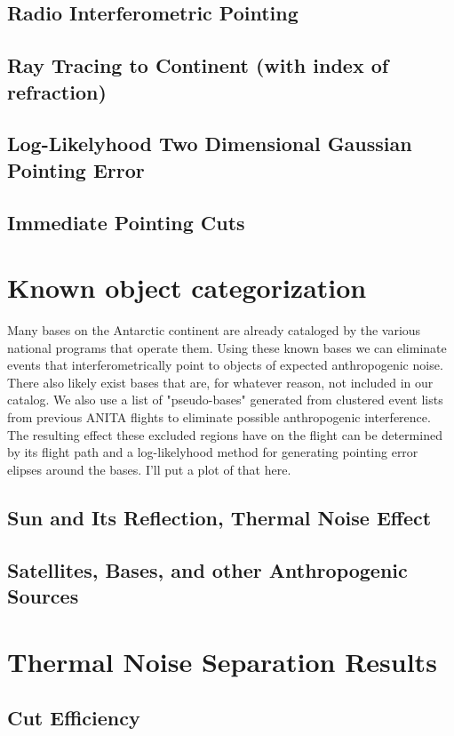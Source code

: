 	\subsection{Radio Interferometric Pointing}
	\subsection{Ray Tracing to Continent (with index of refraction)}
	\subsection{Log-Likelyhood Two Dimensional Gaussian Pointing Error}
	\subsection{Immediate Pointing Cuts}


\section{Known object categorization}
	Many bases on the Antarctic continent are already cataloged by the various national programs that operate them.  Using these known bases we can eliminate events that interferometrically point to objects of expected anthropogenic noise.  There also likely exist bases that are, for whatever reason, not included in our catalog.  We also use a list of "pseudo-bases" generated from clustered event lists from previous ANITA flights to eliminate possible anthropogenic interference.  The resulting effect these excluded regions have on the flight can be determined by its flight path and a log-likelyhood method for generating pointing error elipses around the bases.  I'll put a plot of that here.
	\subsection{Sun and Its Reflection, Thermal Noise Effect}
	\subsection{Satellites, Bases, and other Anthropogenic Sources}

\section{Thermal Noise Separation Results}
	\subsection{Cut Efficiency}
